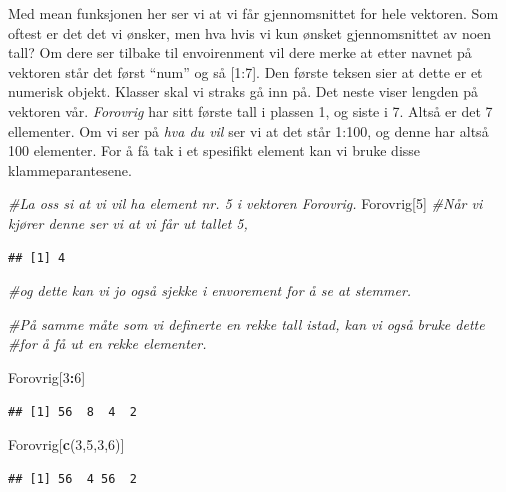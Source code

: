 \documentclass[
]{article}
\newenvironment{Shaded}{\begin{snugshade}}{\end{snugshade}}
\newcommand{\CommentTok}[1]{\textcolor[rgb]{0.56,0.35,0.01}{\textit{#1}}}
\newcommand{\DecValTok}[1]{\textcolor[rgb]{0.00,0.00,0.81}{#1}}
\newcommand{\KeywordTok}[1]{\textcolor[rgb]{0.13,0.29,0.53}{\textbf{#1}}}
\newcommand{\NormalTok}[1]{#1}
\newcommand{\OperatorTok}[1]{\textcolor[rgb]{0.81,0.36,0.00}{\textbf{#1}}}
\begin{document}
Med mean funksjonen her ser vi at vi får gjennomsnittet for hele
vektoren. Som oftest er det det vi ønsker, men hva hvis vi kun ønsket
gjennomsnittet av noen tall? Om dere ser tilbake til envoirenment vil
dere merke at etter navnet på vektoren står det først ``num'' og så
{[}1:7{]}. Den første teksen sier at dette er et numerisk objekt.
Klasser skal vi straks gå inn på. Det neste viser lengden på vektoren
vår. \emph{Forovrig} har sitt første tall i plassen 1, og siste i 7.
Altså er det 7 ellementer. Om vi ser på \emph{hva du vil} ser vi at det
står 1:100, og denne har altså 100 elementer. For å få tak i et
spesifikt element kan vi bruke disse klammeparantesene.

\begin{Shaded}
\begin{Highlighting}[]
\CommentTok{#La oss si at vi vil ha element nr. 5 i vektoren Forovrig.}
\NormalTok{Forovrig[}\DecValTok{5}\NormalTok{] }\CommentTok{#Når vi kjører denne ser vi at vi får ut tallet 5,}
\end{Highlighting}
\end{Shaded}

\begin{verbatim}
## [1] 4
\end{verbatim}

\begin{Shaded}
\begin{Highlighting}[]
            \CommentTok{#og dette kan vi jo også sjekke i envorement for å se at stemmer. }

\CommentTok{#På samme måte som vi definerte en rekke tall istad, kan vi også bruke dette}
\CommentTok{#for å få ut en rekke elementer. }

\NormalTok{Forovrig[}\DecValTok{3}\OperatorTok{:}\DecValTok{6}\NormalTok{]}
\end{Highlighting}
\end{Shaded}

\begin{verbatim}
## [1] 56  8  4  2
\end{verbatim}

\begin{Shaded}
\begin{Highlighting}[]
\NormalTok{Forovrig[}\KeywordTok{c}\NormalTok{(}\DecValTok{3}\NormalTok{,}\DecValTok{5}\NormalTok{,}\DecValTok{3}\NormalTok{,}\DecValTok{6}\NormalTok{)]}
\end{Highlighting}
\end{Shaded}

\begin{verbatim}
## [1] 56  4 56  2
\end{verbatim}
\end{document}
